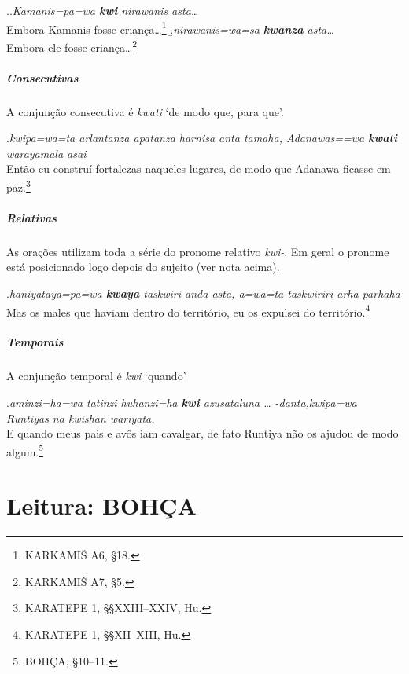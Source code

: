\ex.\a.\emph{Kamanis=pa=wa \textbf{kwi} nirawanis asta\ldots{}}\\
Embora Kamanis fosse criança\ldots{}\footnote{KARKAMIŠ A6, §18.}
\b.\emph{nirawanis=wa=sa \textbf{kwanza} asta\ldots{}}\\
Embora ele fosse criança\ldots{}\footnote{KARKAMIŠ A7, §5.}


\paragraph{Consecutivas}
A conjunção consecutiva é \emph{kwati} `de modo que, para que'.

\ex.\emph{kwipa=wa=ta arlantanza apatanza harnisa anta tamaha,
	Adanawas=\linebreak=wa
	\textbf{kwa\-ti} warayamala asai}\\
Então eu construí fortalezas naqueles lugares, de modo que Adanawa\linebreak
ficasse em paz.\footnote{KARATEPE 1, §§XXIII--XXIV, Hu.}

\paragraph{Relativas}
As orações utilizam toda a série do pronome relativo \emph{kwi-}.
Em geral o pronome está posicionado logo depois do sujeito (ver nota acima).

\ex.\emph{haniyataya=pa=wa \textbf{kwaya} taskwiri anda asta, a=wa=ta
	taskwiriri arha par\-haha}\\
Mas os males que haviam dentro do território, eu os expulsei do
território.\footnote{KARATEPE 1, §§XII--XIII, Hu.}

\paragraph{Temporais}
A conjunção temporal é \emph{kwi} `quando'

\ex.\emph{aminzi=ha=wa tatinzi huhanzi=ha \textbf{kwi} azusataluna {\ldots}
	-danta,\linebreak kwipa=wa Runtiyas na
	kwishan wariyata.}\\
E quando meus pais e avôs iam cavalgar, de fato Runtiya não
os ajudou de modo algum.\footnote{BOHÇA, §10--11.}

\clearpage



\chapter{Leitura: BOHÇA}


